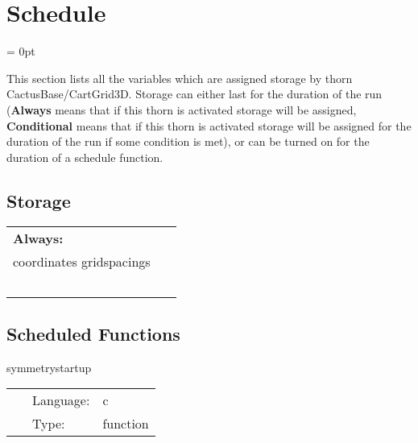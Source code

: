 
\section{Schedule} 


\parskip = 0pt


\noindent This section lists all the variables which are assigned storage by thorn CactusBase/CartGrid3D.  Storage can either last for the duration of the run ({\bf Always} means that if this thorn is activated storage will be assigned, {\bf Conditional} means that if this thorn is activated storage will be assigned for the duration of the run if some condition is met), or can be turned on for the duration of a schedule function.


\subsection*{Storage}

\hspace{5mm}

 \begin{tabular*}{160mm}{ll} 

{\bf Always:}&  ~ \\ 
 coordinates gridspacings & ~\\ 
~ & ~\\ 
\end{tabular*} 


\subsection*{Scheduled Functions}
\vspace{5mm}


\hspace{5mm} symmetrystartup 

\hspace{5mm}{\it register gh extension for gridsymmetry } 


\hspace{5mm}

 \begin{tabular*}{160mm}{cll} 
~ & Language:  & c \\ 
~ & Type:  & function \\ 
\end{tabular*} 


\vspace{5mm}


